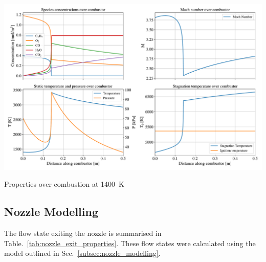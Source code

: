 \documentclass[a4paper]{article}
\begin{document}
\begin{widefigure}[10mm]
    \centering
    \includegraphics[width=\linewidth]{part_2_img/subfig_1400.pdf}
    \caption{Properties over combustion at 1400~K}
    \label{fig:properties_1400}
\end{widefigure}

\newpage
\subsection{Nozzle Modelling}
The flow state exiting the nozzle is summarised in Table.~\ref{tab:nozzle_exit_properties}. These flow states were calculated using the model outlined in Sec.~\ref{subsec:nozzle_modelling}.
\end{document}
